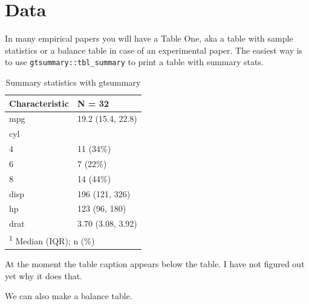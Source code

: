 \documentclass[
  11pt,
a4paper
]{article}
\begin{document}
\FloatBarrier

\hypertarget{data}{%
\section{Data}\label{data}}

In many empirical papers you will have a Table One, aka a table with sample statistics or a balance table in case of an experimental paper. The easiest way is to use \texttt{gtsummary::tbl\_summary} to print a table with summary stats.

\begin{table}

\caption{\label{tab:summary1}Summary statistics with gtsummary}
\centering
\begin{tabular}[t]{ll}
\toprule
Characteristic & N = 32\\
\midrule
mpg & 19.2 (15.4, 22.8)\\
cyl & \\
\hspace{1em}4 & 11 (34\%)\\
\hspace{1em}6 & 7 (22\%)\\
\hspace{1em}8 & 14 (44\%)\\
\addlinespace
disp & 196 (121, 326)\\
hp & 123 (96, 180)\\
drat & 3.70 (3.08, 3.92)\\
\bottomrule
\multicolumn{2}{l}{\rule{0pt}{1em}\textsuperscript{1} Median (IQR); n (\%)}\\
\end{tabular}
\end{table}

At the moment the table caption appears below the table. I have not figured out yet why it does that.

We can also make a balance table.
\end{document}
